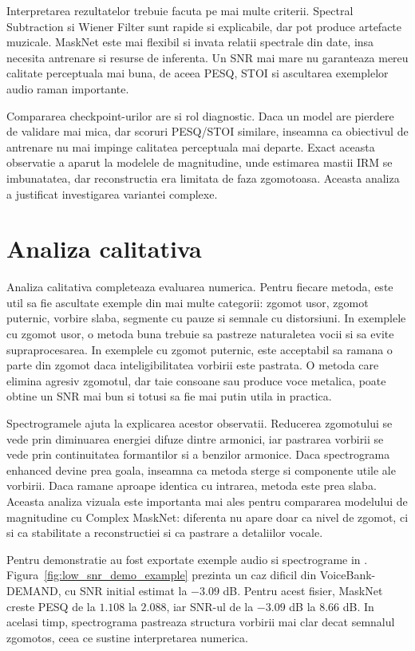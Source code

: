 \documentclass[12pt,a4paper]{report}
\begin{document}
Interpretarea rezultatelor trebuie facuta pe mai multe criterii. Spectral
Subtraction si Wiener Filter sunt rapide si explicabile, dar pot produce
artefacte muzicale. MaskNet este mai flexibil si invata relatii spectrale din
date, insa necesita antrenare si resurse de inferenta. Un SNR mai mare nu
garanteaza mereu calitate perceptuala mai buna, de aceea PESQ, STOI si
ascultarea exemplelor audio raman importante.

Compararea checkpoint-urilor are si rol diagnostic. Daca un model are pierdere
de validare mai mica, dar scoruri PESQ/STOI similare, inseamna ca obiectivul de
antrenare nu mai impinge calitatea perceptuala mai departe. Exact aceasta
observatie a aparut la modelele de magnitudine, unde estimarea mastii IRM se
imbunatatea, dar reconstructia era limitata de faza zgomotoasa. Aceasta analiza
a justificat investigarea variantei complexe.

\section{Analiza calitativa}

Analiza calitativa completeaza evaluarea numerica. Pentru fiecare metoda, este
util sa fie ascultate exemple din mai multe categorii: zgomot usor, zgomot
puternic, vorbire slaba, segmente cu pauze si semnale cu distorsiuni. In
exemplele cu zgomot usor, o metoda buna trebuie sa pastreze naturaletea vocii si
sa evite supraprocesarea. In exemplele cu zgomot puternic, este acceptabil sa
ramana o parte din zgomot daca inteligibilitatea vorbirii este pastrata. O
metoda care elimina agresiv zgomotul, dar taie consoane sau produce voce
metalica, poate obtine un SNR mai bun si totusi sa fie mai putin utila in
practica.

Spectrogramele ajuta la explicarea acestor observatii. Reducerea zgomotului se
vede prin diminuarea energiei difuze dintre armonici, iar pastrarea vorbirii se
vede prin continuitatea formantilor si a benzilor armonice. Daca spectrograma
enhanced devine prea goala, inseamna ca metoda sterge si componente utile ale
vorbirii. Daca ramane aproape identica cu intrarea, metoda este prea slaba.
Aceasta analiza vizuala este importanta mai ales pentru compararea modelului de
magnitudine cu Complex MaskNet: diferenta nu apare doar ca nivel de zgomot, ci
si ca stabilitate a reconstructiei si ca pastrare a detaliilor vocale.

Pentru demonstratie au fost exportate exemple audio si spectrograme in
. Figura~\ref{fig:low_snr_demo_example}
prezinta un caz dificil din VoiceBank-DEMAND, cu SNR initial estimat la
\(-3.09\) dB. Pentru acest fisier, MaskNet creste PESQ de la \(1.108\) la
\(2.088\), iar SNR-ul de la \(-3.09\) dB la \(8.66\) dB. In acelasi timp,
spectrograma pastreaza structura vorbirii mai clar decat semnalul zgomotos,
ceea ce sustine interpretarea numerica.
\end{document}
